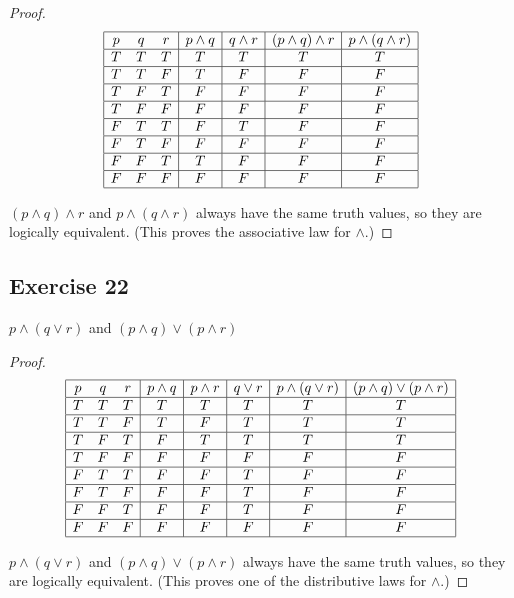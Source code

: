 \documentclass[14pt]{extarticle}
\begin{document}
\begin{proof}
$$
\begin{array}{|ccc|c|c|c|c|}
\hline
p & q & r & p \wedge q & q \wedge r & (p \wedge q) \wedge r & p \wedge (q \wedge r) \\
\hline
T & T & T & T & T & T & T \\
\hline
T & T & F & T & F & F & F \\
\hline
T & F & T & F & F & F & F \\
\hline
T & F & F & F & F & F & F \\
\hline
F & T & T & F & T & F & F \\
\hline
F & T & F & F & F & F & F \\
\hline
F & F & T & T & F & F & F \\
\hline
F & F & F & F & F & F & F \\
\hline
\end{array}
$$

$(p \wedge q) \wedge r$ and $p \wedge (q \wedge r)$ always have the same truth values, so they are logically equivalent. (This proves the associative law for $\wedge$.)
\end{proof}

\subsection{Exercise 22}
$p \wedge (q \vee r)$ and $(p \wedge q) \vee (p \wedge r)$

\begin{proof}
$$
\begin{array}{|ccc|c|c|c|c|c|}
\hline
p & q & r & p \wedge q & p \wedge r & q \vee r & p \wedge (q \vee r) & (p \wedge q) \vee (p \wedge r) \\
\hline
T & T & T & T & T & T & T & T \\
\hline
T & T & F & T & F & T & T & T \\
\hline
T & F & T & F & T & T & T & T \\
\hline
T & F & F & F & F & F & F & F \\
\hline
F & T & T & F & F & T & F & F \\
\hline
F & T & F & F & F & T & F & F \\
\hline
F & F & T & F & F & T & F & F \\
\hline
F & F & F & F & F & F & F & F \\
\hline
\end{array}
$$

$p \wedge (q \vee r)$ and $(p \wedge q) \vee (p \wedge r)$ always have the same truth values, so they are logically equivalent. (This proves one of the distributive laws for $\wedge$.)
\end{proof}
\end{document}
